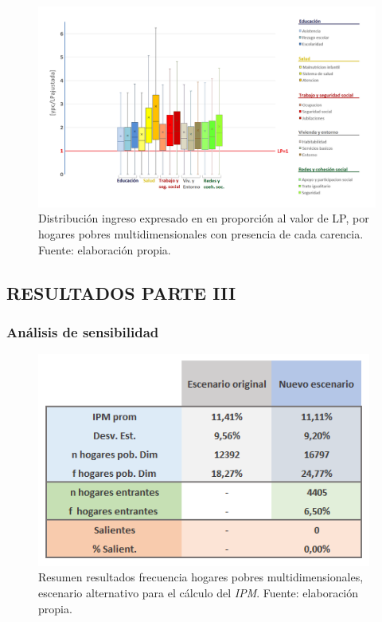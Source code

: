 \documentclass[12pt,letterpaper,spanish]{article}
\begin{document}
\begin{figure}[!]
    \centering
    \includegraphics[width=\textwidth]{Max/box_carencias.png}
    \caption{Distribución ingreso expresado en en proporción al valor de LP, por hogares pobres multidimensionales con presencia de cada carencia. Fuente: elaboración propia.}
    \label{box_carencias}
\end{figure}

\subsection{RESULTADOS PARTE III}


\subsubsection{Análisis de sensibilidad}




\begin{figure}[H]
    \centering
        \includegraphics[width=11cm]{Max/estadistica_escenario.png}
    \caption{Resumen resultados frecuencia hogares pobres multidimensionales, escenario alternativo para el cálculo del \textit{IPM}. Fuente: elaboración propia.}
    \label{resusensible}
\end{figure}
\end{document}
